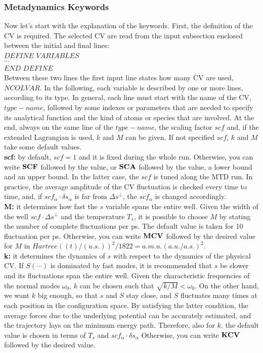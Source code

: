 \documentclass[twoside,10pt,titlepage,a4paper]{article}
\begin{document}
\subsubsection{Metadynamics Keywords}
Now let's start with the explanation of the keywords. First, the definition of the CV is required.
The selected CV are read from the input subsection enclosed between the initial and final lines: \\
$DEFINE $ $ VARIABLES$ \\
$\cdots$ \\
$END $ $DEFINE$ \\
Between these two lines the first input line states how many CV are used, $NCOLVAR$.
In the following, each variable is described by one or more lines, according to its type.
In general, each line must start with the name of the CV, $type-name$,
followed by some indexes or parameters that are needed to
specify its analytical function and the kind of atoms or species that are involved.
At the end, always on the same line of the $type-name$,
the scaling factor $scf$ and, if the extended Lagrangian is used, $k$ and $M$ can be given.
If not specified $scf$, $k$ and $M$ take some default values. \\
{\bf scf:} by default, $scf=1$ and it is fixed during the whole run.
Otherwise, you can write ${\bf SCF}$ followed by the value, or
${\bf SCA}$ followed by the value, a lower bound and an upper bound.
In the latter case, the $scf$ is tuned along the MTD run.
In practice, the average amplitude of the CV fluctuation is checked every
time to time, and, if $scf_{\alpha}\cdot\delta s_{\alpha}$ is far from
$\Delta s^{\perp}$, the $scf_{\alpha}$ is changed accordingly.  \\
{\bf M:} it determines how fast the $s$ variable spans the entire well.
Given the width of the well $scf\cdot\Delta s^{\perp}$  and the temperature
$T_s$, it is possible to choose $M$ by stating the number of complete
fluctuations per ps. The default value is taken for 10 fluctuation per ps.
Otherwise, you can write ${\bf MCV}$  followed by the desired value for
$M$ in $Hartree ((t)/(u.s.))^2/1822 = a.m.u. (a.u./a.s.)^2$. \\
{\bf k:} it determines the dynamics of $s$ with respect to the dynamics of the
physical CV. If $S(\cdots)$ is dominated by fast modes,
it is recommended that $s$ be slower and its fluctuations span the entire well.
Given the characteristic frequencies of the normal modes $\omega_{0}$, $k$ can
be chosen such that $\sqrt{k/M}< \omega_{0}$. On the other hand,
we want $k$ big enough, so that $s$ and $S$ stay close, and $S$ fluctuates
many times at each position in the configuration space.
By satisfying the latter condition, the average forces due to the
underlying potential can be accurately estimated, and the trajectory
lays on the minimum energy path. Therefore, also for $k$, the default
value is chosen in terms of  $T_s$ and $scf_{\alpha}\cdot\delta s_{\alpha}$
Otherwise,  you can write ${\bf KCV}$  followed by the desired value. \\
\end{document}
